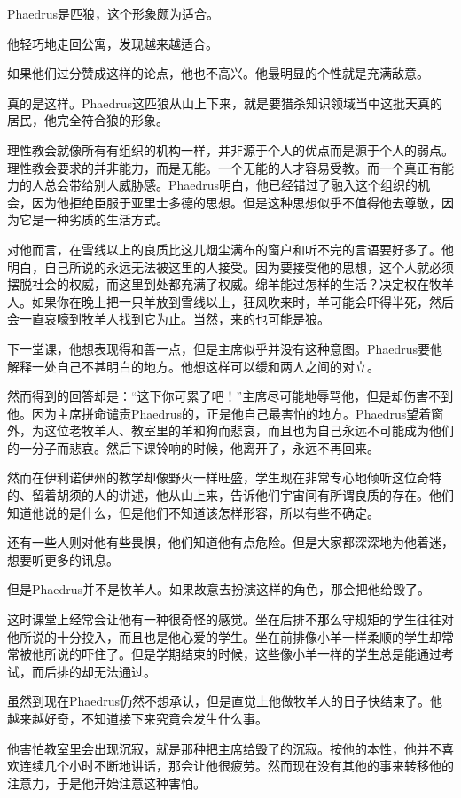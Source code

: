 \documentclass[UTF8]{article}
\begin{document}
\par Phaedrus是匹狼，这个形象颇为适合。
\par 他轻巧地走回公寓，发现越来越适合。
\par 如果他们过分赞成这样的论点，他也不高兴。他最明显的个性就是充满敌意。
\par 真的是这样。Phaedrus这匹狼从山上下来，就是要猎杀知识领域当中这批天真的居民，他完全符合狼的形象。
\par 理性教会就像所有有组织的机构一样，并非源于个人的优点而是源于个人的弱点。理性教会要求的并非能力，而是无能。一个无能的人才容易受教。而一个真正有能力的人总会带给别人威胁感。Phaedrus明白，他已经错过了融入这个组织的机会，因为他拒绝臣服于亚里士多德的思想。但是这种思想似乎不值得他去尊敬，因为它是一种劣质的生活方式。
\par 对他而言，在雪线以上的良质比这儿烟尘满布的窗户和听不完的言语要好多了。他明白，自己所说的永远无法被这里的人接受。因为要接受他的思想，这个人就必须摆脱社会的权威，而这里到处都充满了权威。绵羊能过怎样的生活？决定权在牧羊人。如果你在晚上把一只羊放到雪线以上，狂风吹来时，羊可能会吓得半死，然后会一直哀嚎到牧羊人找到它为止。当然，来的也可能是狼。
\par 下一堂课，他想表现得和善一点，但是主席似乎并没有这种意图。Phaedrus要他解释一处自己不甚明白的地方。他想这样可以缓和两人之间的对立。
\par 然而得到的回答却是：“这下你可累了吧！”主席尽可能地辱骂他，但是却伤害不到他。因为主席拼命谴责Phaedrus的，正是他自己最害怕的地方。Phaedrus望着窗外，为这位老牧羊人、教室里的羊和狗而悲哀，而且也为自己永远不可能成为他们的一分子而悲哀。然后下课铃响的时候，他离开了，永远不再回来。
\par 然而在伊利诺伊州的教学却像野火一样旺盛，学生现在非常专心地倾听这位奇特的、留着胡须的人的讲述，他从山上来，告诉他们宇宙间有所谓良质的存在。他们知道他说的是什么，但是他们不知道该怎样形容，所以有些不确定。
\par 还有一些人则对他有些畏惧，他们知道他有点危险。但是大家都深深地为他着迷，想要听更多的讯息。
\par 但是Phaedrus并不是牧羊人。如果故意去扮演这样的角色，那会把他给毁了。
\par 这时课堂上经常会让他有一种很奇怪的感觉。坐在后排不那么守规矩的学生往往对他所说的十分投入，而且也是他心爱的学生。坐在前排像小羊一样柔顺的学生却常常被他所说的吓住了。但是学期结束的时候，这些像小羊一样的学生总是能通过考试，而后排的却无法通过。
\par 虽然到现在Phaedrus仍然不想承认，但是直觉上他做牧羊人的日子快结束了。他越来越好奇，不知道接下来究竟会发生什么事。
\par 他害怕教室里会出现沉寂，就是那种把主席给毁了的沉寂。按他的本性，他并不喜欢连续几个小时不断地讲话，那会让他很疲劳。然而现在没有其他的事来转移他的注意力，于是他开始注意这种害怕。
\end{document}
